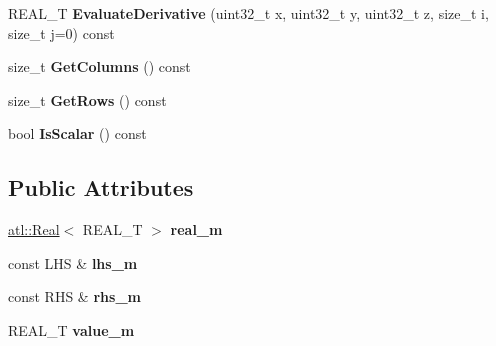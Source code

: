\begin{DoxyCompactItemize}
\item 
\hypertarget{structatl_1_1_add_ad2ce1f0c07eba054a060c0c59f2e1e18}{R\+E\+A\+L\+\_\+\+T {\bfseries Evaluate\+Derivative} (uint32\+\_\+t x, uint32\+\_\+t y, uint32\+\_\+t z, size\+\_\+t i, size\+\_\+t j=0) const }\label{structatl_1_1_add_ad2ce1f0c07eba054a060c0c59f2e1e18}

\item 
\hypertarget{structatl_1_1_add_a221c4901b9658ab182b8be2e22554d96}{size\+\_\+t {\bfseries Get\+Columns} () const }\label{structatl_1_1_add_a221c4901b9658ab182b8be2e22554d96}

\item 
\hypertarget{structatl_1_1_add_a1786888970115c87917cc4e9d8571d4f}{size\+\_\+t {\bfseries Get\+Rows} () const }\label{structatl_1_1_add_a1786888970115c87917cc4e9d8571d4f}

\item 
\hypertarget{structatl_1_1_add_a88202aac52b67fab9f56026dff51339b}{bool {\bfseries Is\+Scalar} () const }\label{structatl_1_1_add_a88202aac52b67fab9f56026dff51339b}

\end{DoxyCompactItemize}
\subsection*{Public Attributes}
\begin{DoxyCompactItemize}
\item 
\hypertarget{structatl_1_1_add_a46d0634fe0b197343c13de852b5b0cfa}{\hyperlink{structatl_1_1_real}{atl\+::\+Real}$<$ R\+E\+A\+L\+\_\+\+T $>$ {\bfseries real\+\_\+m}}\label{structatl_1_1_add_a46d0634fe0b197343c13de852b5b0cfa}

\item 
\hypertarget{structatl_1_1_add_aa2543240a578b7104a53ebf9d6c7ebdc}{const L\+H\+S \& {\bfseries lhs\+\_\+m}}\label{structatl_1_1_add_aa2543240a578b7104a53ebf9d6c7ebdc}

\item 
\hypertarget{structatl_1_1_add_aa2afd32dc41b6ab5effcf61b6c8e787c}{const R\+H\+S \& {\bfseries rhs\+\_\+m}}\label{structatl_1_1_add_aa2afd32dc41b6ab5effcf61b6c8e787c}

\item 
\hypertarget{structatl_1_1_add_a121a24d70ab887948e8b8a9d31197ac1}{R\+E\+A\+L\+\_\+\+T {\bfseries value\+\_\+m}}\label{structatl_1_1_add_a121a24d70ab887948e8b8a9d31197ac1}

\end{DoxyCompactItemize}


